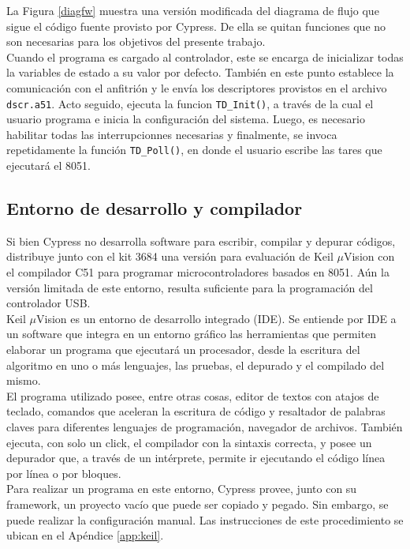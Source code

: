 	La Figura \ref{diagfw} muestra una versión modificada del diagrama de flujo que sigue el código fuente provisto por Cypress. De ella se quitan funciones que no son necesarias para los objetivos del presente trabajo.\\
	
	Cuando el programa es cargado al controlador, este se encarga de inicializar todas la variables de estado a su valor por defecto. También en este punto establece la comunicación con el anfitrión y le envía los descriptores provistos en el archivo \verb|dscr.a51|. Acto seguido, ejecuta la funcion \verb|TD_Init()|, a través de la cual el usuario programa e inicia la configuración del sistema. Luego, es necesario habilitar todas las interrupcionnes necesarias y finalmente, se invoca repetidamente la función \verb|TD_Poll()|, en donde el usuario escribe las tares que ejecutará el 8051.\\
	
	\subsection{Entorno de desarrollo y compilador}
	Si bien Cypress no desarrolla software para escribir, compilar y depurar códigos, distribuye junto con el kit 3684 una versión para evaluación de Keil $\mu$Vision con el compilador C51 para programar microcontroladores basados en 8051. Aún la versión limitada de este entorno, resulta suficiente para la programación del controlador USB.\\
	
	Keil $\mu$Vision es un entorno de desarrollo integrado (IDE). Se entiende por IDE a un software que integra en un entorno gráfico las herramientas que permiten elaborar un programa que ejecutará un procesador, desde la escritura del algoritmo en uno o más lenguajes, las pruebas, el depurado y el compilado del mismo.\\
	
	El programa utilizado posee, entre otras cosas, editor de textos con atajos de teclado, comandos que aceleran la escritura de código y resaltador de palabras claves para diferentes lenguajes de programación, navegador de archivos. También ejecuta, con solo un click, el compilador con la sintaxis correcta, y posee un depurador que, a través de un intérprete, permite ir ejecutando el código línea por línea o por bloques.\\
	
	Para realizar un programa en este entorno, Cypress provee, junto con su framework, un proyecto vacío que puede ser copiado y pegado. Sin embargo, se puede realizar la configuración manual. Las instrucciones de este procedimiento se ubican en el Apéndice \ref{app:keil}.\\
	
